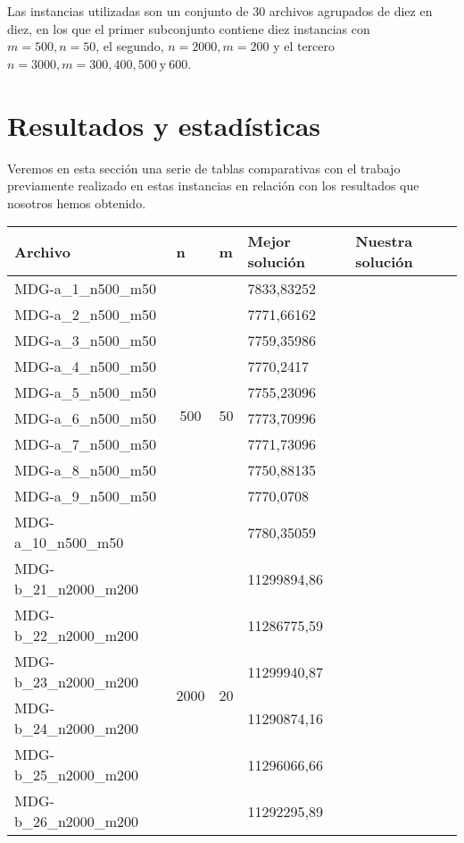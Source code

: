 Las instancias utilizadas son un conjunto de 30 archivos agrupados de diez en diez, en los que el primer subconjunto contiene diez instancias con $m = 500, n=50$, el segundo, $n = 2000, m = 200$ y el tercero $n = 3000, m = 300, 400, 500 \ \text{y} \ 600$.

\section{Resultados y estadísticas}
Veremos en esta sección una serie de tablas comparativas con el trabajo previamente realizado en estas instancias en relación con los resultados que nosotros hemos obtenido.



\begin{table}[h]
    \centering
    \begin{tabular}{@{}lc|cll@{}}
        \toprule
        \textbf{Archivo} & \multicolumn{1}{l|}{\textbf{n}} & \multicolumn{1}{l}{\textbf{m}} & \multicolumn{1}{l}{\textbf{Mejor solución}} & \textbf{Nuestra solución} \\ \midrule
    MDG-a\_1\_n500\_m50 & \multirow{10}{*}{500} & \multirow{10}{*}{50} & 7833,83252 &  \\
    MDG-a\_2\_n500\_m50 &  &  & 7771,66162 &  \\
    MDG-a\_3\_n500\_m50 &  &  & 7759,35986 &  \\
    MDG-a\_4\_n500\_m50 &  &  & 7770,2417 &  \\
    MDG-a\_5\_n500\_m50 &  &  & 7755,23096 &  \\
    MDG-a\_6\_n500\_m50 &  &  & 7773,70996 &  \\
    MDG-a\_7\_n500\_m50 &  &  & 7771,73096 &  \\
    MDG-a\_8\_n500\_m50 &  &  & 7750,88135 &  \\
    MDG-a\_9\_n500\_m50 &  &  & 7770,0708 &  \\
    MDG-a\_10\_n500\_m50 &  &  & 7780,35059 &  \\ \midrule
    MDG-b\_21\_n2000\_m200 & \multirow{10}{*}{2000} & \multirow{10}{*}{20} & 11299894,86 &  \\
    MDG-b\_22\_n2000\_m200 &  &  & 11286775,59 &  \\
    MDG-b\_23\_n2000\_m200 &  &  & 11299940,87 &  \\
    MDG-b\_24\_n2000\_m200 &  &  & 11290874,16 &  \\
    MDG-b\_25\_n2000\_m200 &  &  & 11296066,66 &  \\
    MDG-b\_26\_n2000\_m200 &  &  & 11292295,89 &  \\

\end{tabular}
\end{table}
